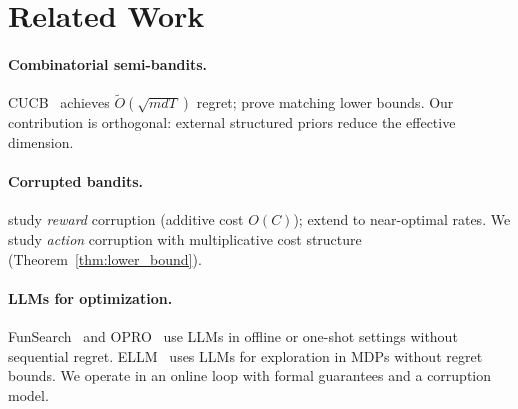 \documentclass{article}
\begin{document}
%

\section{Related Work}
\label{sec:related}

\paragraph{Combinatorial semi-bandits.}
CUCB~\citep{chen2013combinatorial} achieves $\tilde{O}(\sqrt{mdT})$ regret; \citet{kveton2015tight} prove matching lower bounds.
Our contribution is orthogonal: external structured priors reduce the effective dimension.

\paragraph{Corrupted bandits.}
\citet{lykouris2018} study \emph{reward} corruption (additive cost $O(C)$); \citet{he2022nearly} extend to near-optimal rates.
We study \emph{action} corruption with multiplicative cost structure (Theorem~\ref{thm:lower_bound}).

\paragraph{LLMs for optimization.}
FunSearch~\citep{romera2024mathematical} and OPRO~\citep{yang2024large} use LLMs in offline or one-shot settings without sequential regret.
ELLM~\citep{du2023guiding} uses LLMs for exploration in MDPs without regret bounds.
We operate in an online loop with formal guarantees and a corruption model.
\end{document}
